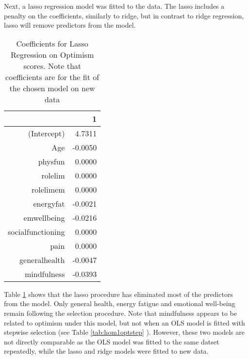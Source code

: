 \documentclass{article}
\begin{document}

Next, a lasso regression model was fitted to the data. The lasso includes a penalty on the coefficients, similarly to ridge, but in contrast to ridge regression, lasso will remove predictors from the model.

\begin{table}[ht]
\centering
\begin{tabular}{rr}
  \hline
 & 1 \\ 
  \hline
(Intercept) & 4.7311 \\ 
  Age & -0.0050 \\ 
  physfun & 0.0000 \\ 
  rolelim & 0.0000 \\ 
  rolelimem & 0.0000 \\ 
  energyfat & -0.0021 \\ 
  emwellbeing & -0.0216 \\ 
  socialfunctioning & 0.0000 \\ 
  pain & 0.0000 \\ 
  generalhealth & -0.0047 \\ 
  mindfulness & -0.0393 \\ 
   \hline
\end{tabular}
\caption{Coefficients for Lasso Regression on Optimism scores. Note that coefficients are for the fit of the chosen model on new data} 
\label{tab:hom1optlasso}
\end{table}
Table \ref{tab:hom1optlasso} shows that the lasso procedure has eliminated most of the predictors from the model. Only general health, energy fatigue and emotional well-being remain following the selection procedure. Note that mindfulness appears to be related to optimism under this model, but not when an OLS model is fitted with stepwise selection (see Table \ref{tab:hom1optstep} ). However, these two models are not directly comparable as the OLS model was fitted to the same datset repeatedly, while the lasso and ridge models were fitted to new data. 
\end{document}
